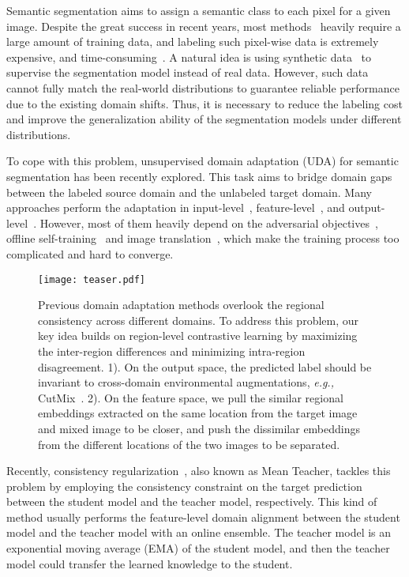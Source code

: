 \documentclass{article}
\begin{document}
Semantic segmentation aims to assign a semantic class to each pixel for a given image. Despite the great success in recent years, most methods~\cite{chen2018deeplab} heavily require a large amount of training data, and labeling such pixel-wise data is extremely expensive, and time-consuming~\cite{cordts2016cityscapes}.  
A natural idea is using synthetic data~\cite{stephan2016gtav,ros2016synthia} to supervise the segmentation model instead of real data.
However, such data cannot fully match the real-world distributions to guarantee reliable performance due to the existing domain shifts. 
Thus, it is necessary to reduce the labeling cost and improve the generalization ability of the segmentation models under different distributions. 

To cope with this problem, unsupervised domain adaptation (UDA) for semantic segmentation has been recently explored.  This task aims to bridge domain gaps between the labeled source domain and the unlabeled target domain.
Many approaches perform the adaptation in input-level~\cite{BDL,LDR}, feature-level~\cite{FDA,CBST,CRST}, and output-level~\cite{AdaptSegNet,SIM,CLANv2}. 
However, most of them heavily depend on the adversarial objectives~\cite{AdaptSegNet,SIM,CLANv2}, offline self-training~\cite{BDL,DAST,CBST,CRST} and image translation~\cite{BDL,LDR}, which make the training process too complicated and hard to converge. 

\begin{figure}[t]

\centering
\texttt{[image: teaser.pdf]}
\caption{ Previous domain adaptation methods overlook the regional consistency across different domains. To address this problem,
our key idea builds on region-level contrastive learning  by maximizing the inter-region differences and  minimizing intra-region disagreement. 1). On the output space, the predicted label should be invariant to cross-domain environmental augmentations, \emph{e.g.,} CutMix~\cite{french2019semi}. 2). On the feature space, we pull the similar regional embeddings extracted on the same location from the target image and mixed image to be closer, and push the dissimilar embeddings from the different locations of the two images to be separated. }
\label{fig0}
\end{figure}

Recently, consistency regularization~\cite{choi2019self,tranheden2020dacs}, also known as Mean Teacher, tackles this problem by employing the consistency constraint on the target prediction between the student model and the teacher model, respectively.  This kind of method usually performs the feature-level domain alignment between the student model and the teacher model with an online ensemble. The teacher model is an exponential moving average (EMA) of the student model, and then the teacher model could transfer the learned knowledge to the student.
\end{document}
